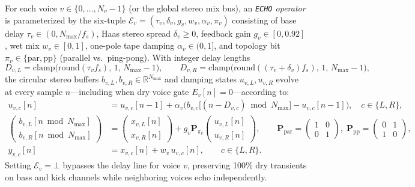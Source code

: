 \begin{definition}
\label{def:echo}
For each voice $v \in \{0, \dots, N_v - 1\}$ (or the global stereo mix bus), an \emph{\texttt{ECHO} operator} is parameterized by the six-tuple $\mathcal{E}_v = (\tau_v, \delta_v, g_v, w_v, \alpha_v, \pi_v)$ consisting of base delay $\tau_v \in (0, N_{\max}/f_s)$, Haas stereo spread $\delta_v \ge 0$, feedback gain $g_v \in [0, 0.92]$, wet mix $w_v \in [0, 1]$, one-pole tape damping $\alpha_v \in (0, 1]$, and topology bit $\pi_v \in \{\mathrm{par}, \mathrm{pp}\}$ (parallel vs.\ ping-pong). With integer delay lengths
\begin{equation}
D_{v,L} = \mathrm{clamp}\!\big(\mathrm{round}(\tau_v f_s),\, 1,\, N_{\max}-1\big), \qquad
D_{v,R} = \mathrm{clamp}\!\big(\mathrm{round}((\tau_v + \delta_v) f_s),\, 1,\, N_{\max}-1\big),
\end{equation}
the circular stereo buffers $b_{v,L}, b_{v,R} \in \mathbb{R}^{N_{\max}}$ and damping states $u_{v,L}, u_{v,R}$ evolve at every sample $n$—including when dry voice gate $E_v[n] = 0$—according to:
\begin{align}
u_{v,c}[n] &= u_{v,c}[n-1] + \alpha_v\Big(b_{v,c}\big[(n - D_{v,c}) \bmod N_{\max}\big] - u_{v,c}[n-1]\Big), \quad c \in \{L, R\}, \\
\begin{pmatrix} b_{v,L}[n \bmod N_{\max}] \\ b_{v,R}[n \bmod N_{\max}] \end{pmatrix}
&= \begin{pmatrix} x_{v,L}[n] \\ x_{v,R}[n] \end{pmatrix}
+ g_v \mathbf{P}_{\pi_v} \begin{pmatrix} u_{v,L}[n] \\ u_{v,R}[n] \end{pmatrix},
\qquad
\mathbf{P}_{\mathrm{par}} = \begin{pmatrix} 1 & 0 \\ 0 & 1 \end{pmatrix},\;
\mathbf{P}_{\mathrm{pp}} = \begin{pmatrix} 0 & 1 \\ 1 & 0 \end{pmatrix}, \\
y_{v,c}[n] &= x_{v,c}[n] + w_v\,u_{v,c}[n], \qquad c \in \{L, R\}.
\end{align}
Setting $\mathcal{E}_v = \bot$ bypasses the delay line for voice $v$, preserving 100\% dry transients on bass and kick channels while neighboring voices echo independently.
\end{definition}


